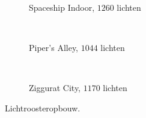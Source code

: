 \begin{figure}[t]
\begin{minipage}[t]{0.5\textwidth}
\begin{adjustbox}{minipage=\textwidth, scale=0.55}
    \begin{subfigure}[b]{1.6\textwidth}
      \centering
      \def\svgwidth{\textwidth}
      
      \caption{Spaceship Indoor, $1260$ lichten}
      \vspace{4pt}
      \label{fig:ts-resolution-grid:indoor}
    \end{subfigure}
  \end{adjustbox} \\
  \begin{adjustbox}{minipage=\textwidth, scale=0.55}
    \begin{subfigure}[b]{1.6\textwidth}
      \centering
      \def\svgwidth{\textwidth}
      
      \caption{Piper's Alley, $1044$ lichten}
      \vspace{4pt}
      \label{fig:ts-resolution-grid:alley}
    \end{subfigure}
  \end{adjustbox} \\
  \begin{adjustbox}{minipage=\textwidth, scale=0.55}
    \begin{subfigure}[b]{1.6\textwidth}
      \centering
      \def\svgwidth{\textwidth}
      
      \caption{Ziggurat City, $1170$ lichten}
      \label{fig:ts-resolution-grid:city}
    \end{subfigure}
  \end{adjustbox}
  \caption{\small Lichtroosteropbouw. }
  \label{fig:ts-resolution-grid}
  \end{minipage}
\end{figure}


